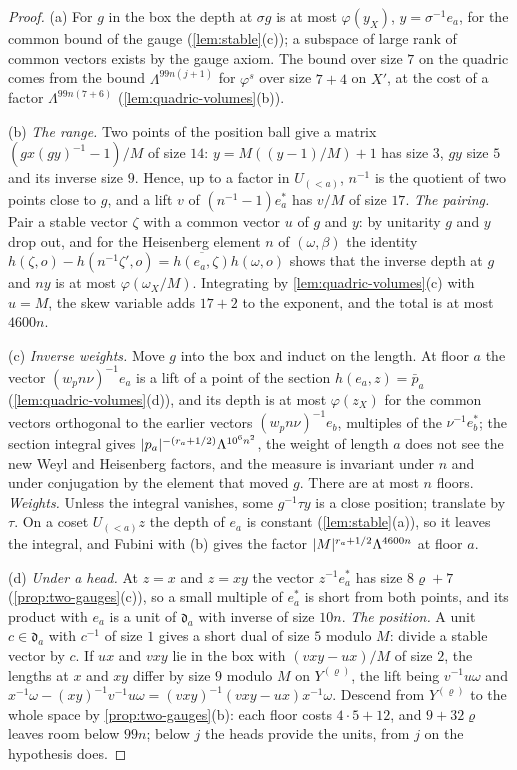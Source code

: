\begin{proof}
(a) For $g$ in the box the depth at $\sigma g$ is at most $\varphi(y_X)$, $y=\sigma^{-1}e_a$, for the common bound of the gauge (\cref{lem:stable}(c)); a subspace of large rank of common vectors exists by the gauge axiom. The bound over size $7$ on the quadric
comes from the bound $\Lambda^{99n(j+1)}$ for $\varphi^s$ over size $7+4$ on $X'$, at the cost of a factor $\Lambda^{99n(7+6)}$ (\cref{lem:quadric-volumes}(b)).

(b) \emph{The range.} Two points of the position ball give a matrix $(gx(gy)^{-1}-1)/M$ of size $14$: $y=M((y-1)/M)+1$ has size $3$, $gy$ size $5$ and its inverse size $9$. Hence, up to a factor in $U_{(<a)}$, $n^{-1}$ is the quotient of two points
close to $g$, and a lift $v$ of $(n^{-1}-1)e^*_a$ has $v/M$ of size $17$. \emph{The pairing.} Pair a stable vector $\zeta$ with a common vector $u$ of $g$ and $y$: by unitarity $g$ and $y$ drop out, and for the Heisenberg element $n$ of $(\omega,\beta)$ the
identity $h(\zeta,o)-h(n^{-1}\zeta',o)=\overline{h(e_a,\zeta)}h(\omega,o)$ shows that the inverse depth at $g$ and $ny$ is at most $\varphi(\omega_X/M)$. Integrating by \cref{lem:quadric-volumes}(c) with $u=M$, the skew variable adds $17+2$ to the
exponent, and the total is at most $4600n$.

(c) \emph{Inverse weights.} Move $g$ into the box and induct on the length. At floor $a$ the vector $(w_pn\nu)^{-1}e_a$ is a lift of a point of the section $h(e_a,z)=\bar p_a$ (\cref{lem:quadric-volumes}(d)), and its depth is at most $\varphi(z_X)$ for the
common vectors orthogonal to the earlier vectors $(w_pn\nu)^{-1}e_b$, multiples of the $\nu^{-1}e^*_b$; the section integral gives $\lvert p_a\rvert^{-(r_a+1/2)}\Lambda^{10^6n^2}$, the weight of length $a$ does not see the new Weyl and Heisenberg factors, and
the measure is invariant under $n$ and under conjugation by the element that moved $g$. There are at most $n$ floors. \emph{Weights.} Unless the integral vanishes, some $g^{-1}\tau y$ is a close position; translate by $\tau$. On a coset
$U_{(<a)}z$ the depth of $e_a$ is constant (\cref{lem:stable}(a)), so it leaves the integral, and Fubini with (b) gives the factor $\lvert M\rvert^{r_a+1/2}\Lambda^{4600n}$ at floor $a$.

(d) \emph{Under a head.} At $z=x$ and $z=xy$ the vector $z^{-1}e^*_a$ has size $8\varrho+7$ (\cref{prop:two-gauges}(c)), so a small multiple of $e^*_a$ is short from both points, and its product with $e_a$ is a unit of $\mathfrak d_a$ with inverse of size $10n$.
\emph{The position.} A unit $c\in\mathfrak d_a$ with $c^{-1}$ of size $1$ gives a short dual of size $5$ modulo $M$: divide a stable vector by $c$. If $ux$ and $vxy$ lie in the box with $(vxy-ux)/M$ of size $2$, the lengths at $x$ and $xy$ differ by size
$9$ modulo $M$ on $Y^{(\varrho)}$, the lift being $v^{-1}u\omega$ and $x^{-1}\omega-(xy)^{-1}v^{-1}u\omega=(vxy)^{-1}(vxy-ux)x^{-1}\omega$. Descend from $Y^{(\varrho)}$ to the whole space by \cref{prop:two-gauges}(b): each floor costs $4\cdot5+12$, and $9+32\varrho$
leaves room below $99n$; below $j$ the heads provide the units, from $j$ on the hypothesis does.
\end{proof}

